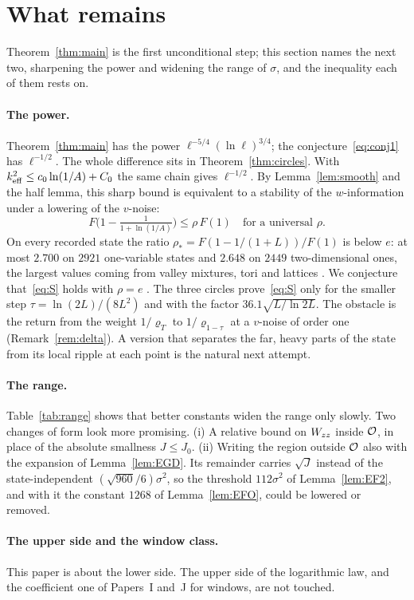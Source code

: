 \section{What remains}
\label{sec:outlook}

Theorem~\ref{thm:main} is the first unconditional step; this section names the next two, sharpening the power and widening the range of $\sigma$, and the inequality each of them rests on.

\paragraph*{The power.}
Theorem~\ref{thm:main} has the power $\ell^{-5/4}(\ln\ell)^{3/4}$; the conjecture~\eqref{eq:conj1} has $\ell^{-1/2}$.
The whole difference sits in Theorem~\ref{thm:circles}.
With $k_{\mathrm{eff}}^2\le c_0\ln(1/A)+C_0$ the same chain gives $\ell^{-1/2}$.
By Lemma~\ref{lem:smooth} and the half lemma, this sharp bound is equivalent to a stability of the $w$-information under a lowering of the $v$-noise:
\begin{equation}
F\big(1-\tfrac1{1+\ln(1/A)}\big)\le\rho\,F(1)\quad\text{for a universal }\rho .
\label{eq:S}
\end{equation}
On every recorded state the ratio $\rho_*=F(1-1/(1+L))/F(1)$ is below $e$: at most $2.700$ on $2921$ one-variable states and $2.648$ on $2449$ two-dimensional ones, the largest values coming from valley mixtures, tori and lattices \numst.
We conjecture that~\eqref{eq:S} holds with $\rho=e$ \conjst.
The three circles prove~\eqref{eq:S} only for the smaller step $\tau=\ln(2L)/(8L^2)$ and with the factor $36.1\sqrt{L/\ln2L}$.
The obstacle is the return from the weight $1/\varrho_T$ to $1/\varrho_{1-\tau}$ at a $v$-noise of order one (Remark~\ref{rem:delta}).
A version that separates the far, heavy parts of the state from its local ripple at each point is the natural next attempt.

\paragraph*{The range.}
Table~\ref{tab:range} shows that better constants widen the range only slowly.
Two changes of form look more promising.
(i) A relative bound on $W_{zz}$ inside $\mathcal O$, in place of the absolute smallness $J\le J_0$.
(ii) Writing the region outside $\mathcal O$ also with the expansion of Lemma~\ref{lem:EGD}.
Its remainder carries $\sqrt J$ instead of the state-independent $(\sqrt{960}/6)\sigma^2$, so the threshold $112\sigma^2$ of Lemma~\ref{lem:EF2}, and with it the constant $1268$ of Lemma~\ref{lem:EFO}, could be lowered or removed.

\paragraph*{The upper side and the window class.}
This paper is about the lower side.
The upper side of the logarithmic law, and the coefficient one of Papers~I and~J for windows, are not touched.

